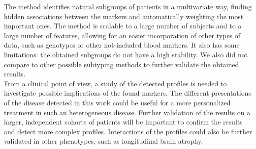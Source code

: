 The method identifies natural subgroups of patients in a multivariate way, finding hidden associations between the markers and automatically weighting the most important ones. The method is scalable to a large number of subjects and to a large number of features, allowing for an easier incorporation of other types of data, such as genotypes or other not-included blood markers. It also has some limitations: the obtained subgroups do not have a high stability. We also did not compare to other possible subtyping methods to further validate the obtained results. \\

From a clinical point of view, a study of the detected profiles is needed to investigate possible implications of the found markers. The different presentations of the disease detected in this work could be useful for a more personalized treatment in such an heterogeneous disease. Further validation of the results on a larger, independent cohorts of patients will be important to confirm the results and detect more complex profiles. Interactions of the profiles could also be further validated in other phenotypes, such as longitudinal brain atrophy.  \\











